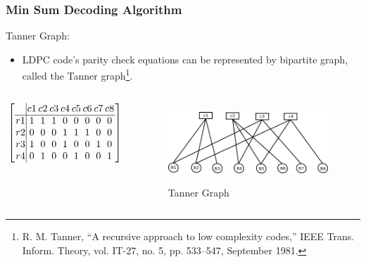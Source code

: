 \documentclass[xcolor=dvipsname]
{beamer}
\begin{document}
\begin{frame}[t]
\frametitle{ Min Sum Decoding Algorithm }
\pause
\alert{Tanner Graph:}
	\begin{itemize}
	\item LDPC code's parity check equations can be represented by bipartite graph, called the Tanner graph\footnote{R. M. Tanner, “A recursive approach to low complexity codes,” IEEE
Trans. Inform. Theory, vol. IT-27, no. 5, pp. 533–547, September 1981.}.
	\end{itemize}

	\begin{columns}[totalwidth=\textwidth]
		\begin{column}{0.5\textwidth}
		\centering
\[
\begingroup %
\setlength\arraycolsep{1pt}
\left[ \begin{array} {c|cccccccc} 
  &    c1 &   c2 &   c3 &  c4  &  c5  &  c6  &  c7  &  c8 \\ \hline
r1 &    1  &   1  &   1  &   0  &   0  &   0  &   0  &   0 \\
r2 &    0  &   0  &   0  &   1  &   1  &   1  &   0  &   0 \\ 
r3 &    1  &   0  &   0  &   1  &   0  &   0  &   1  &   0 \\
r4 &    0  &   1  &   0  &   0  &   1  &   0  &   0  &   1 \end{array} \right] 
\endgroup
\]			
	\end{column}%
	\begin{column}{0.5\textwidth}
		\centering
		\begin{figure}
		\includegraphics[height=3cm,width=6cm]{minSum1}
		\caption{ Tanner Graph }
	\end{figure}
	\end{column}%
\end{columns}
\end{frame}
\end{document}
